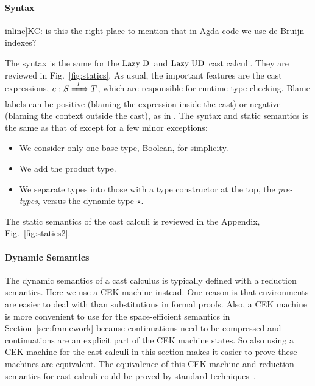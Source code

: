 \documentclass[runningheads]{llncs}
\newcommand{\todo}[1]{}
\newcommand{\figref}[1]{Fig.~\ref{#1}}
\newcommand{\chapref}[1]{Section~\ref{#1}}
\newcommand{\LUD}{\ensuremath{\text{Lazy\;UD}}}
\newcommand{\LD}{\ensuremath{\text{Lazy\;D}}}
\newcommand{\Tdyn}[0]{\ensuremath{\star}}
\newcommand{\ecast}[2]{\ensuremath{#1 : #2}}
\newcommand{\ccast}[3]{#1 \xRightarrow[]{\enskip #2 \enskip} #3}
\begin{document}
\paragraph{Syntax}

\todo[inline]{KC: is this the right place to mention that in Agda
code we use de Bruijn indexes?}

The syntax is the same for the \LD\ and
\LUD\ cast calculi. They are reviewed in \figref{fig:statics}.
As usual, the important features are the cast expressions,
$\ecast{e}{\ccast{S}{l}{T}}$, which are responsible for runtime type
checking. Blame labels can be positive (blaming the expression inside the cast)
or negative (blaming the context outside the cast), as in \cite{wadler2009well}.
The syntax and static semantics is the same as that of 
\citep{siek2009exploring} except for a few minor exceptions:

\begin{itemize}
\item We consider only one base type, Boolean, for simplicity.
\item We add the product type.
\item We separate types into those with a type constructor at the top,
  the \emph{pre-types}, versus the dynamic type \Tdyn.
\end{itemize}

\noindent The static semantics of the cast calculi is reviewed in the
Appendix, \figref{fig:statics2}.

\paragraph{Dynamic Semantics}

The dynamic semantics of a cast calculus is typically defined with a
reduction semantics. Here we use a CEK machine
\citep{felleisen1986control} instead. One reason is that environments
are easier to deal with than substitutions in formal proofs. Also, a
CEK machine is more convenient to use for the space-efficient
semantics in \chapref{sec:framework} because continuations need to be
compressed and continuations are an explicit part of the CEK machine
states.  So also using a CEK machine for the cast calculi in this
section makes it easier to prove these machines are equivalent.  The
equivalence of this CEK machine and reduction semantics for cast
calculi could be proved by standard
techniques~\citep{Felleisen:2009aa}.
\end{document}
